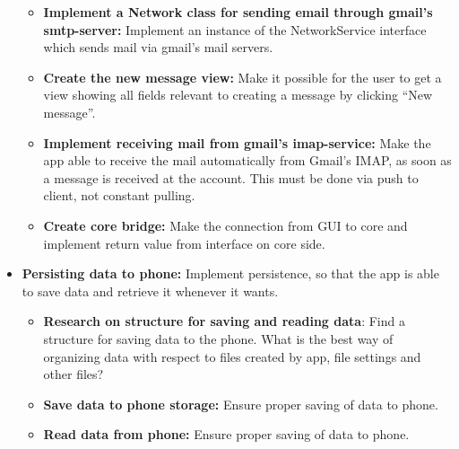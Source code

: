 \begin{itemize}
\begin{itemize}
\item{}\textbf{Implement a Network class for sending email through gmail’s smtp-server:} Implement an instance of the NetworkService interface which sends mail via gmail’s mail servers.
\item{}\textbf{Create the new message view:} Make it possible for the user to get a view showing all fields relevant to creating a message by clicking “New message”.
\item{}\textbf{Implement receiving mail from gmail’s imap-service:} Make the app able to receive the mail automatically from Gmail’s IMAP, as soon as a message is received at the account. This must be done via push to client, not constant pulling.
\item{}\textbf{Create core bridge:} Make the connection from GUI to core and implement return value from interface on core side.
\end{itemize}
\item{}\textbf{Persisting data to phone:} Implement persistence, so that the app is able to save data and retrieve it whenever it wants.
\begin{itemize}
\item{}\textbf{Research on structure for saving and reading data}: Find a structure for saving data to the phone. What is the best way of organizing data with respect to files created by app, file settings and other files?
\item{}\textbf{Save data to phone storage:} Ensure proper saving of data to phone.
\item{}\textbf{Read data from phone:} Ensure proper saving of data to phone.
\end{itemize}
\end{itemize}